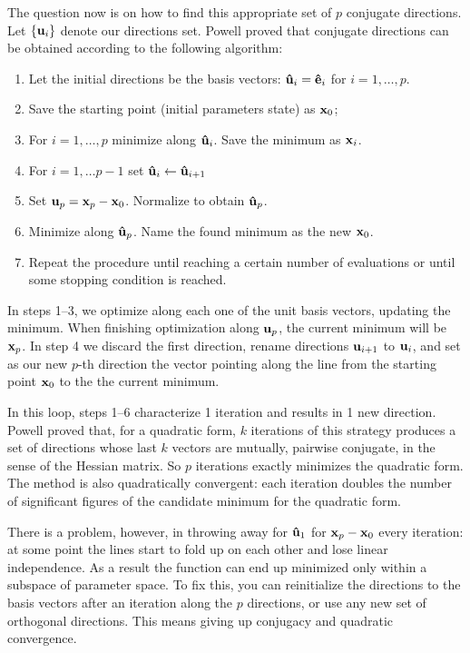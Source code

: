 The question now is on how to find this appropriate set of $p$ conjugate directions. Let $\{\vb{u}_i\}$ denote our directions set. Powell \cite{powell_efficient_1964} proved that conjugate directions can be obtained according to the following algorithm:
\begin{enumerate}
    \item Let the initial directions be the basis vectors: $\vu{u}_i=\vu{e}_i$ for $i=1,\dots, p$.
    \item Save the starting point (initial parameters state) as $\vb{x}_0$;
    \item For $i=1,\dots, p$ minimize along $\vu{u}_i$. Save the minimum as $\vb{x}_i$.
    \item For $i=1,\dots p-1$ set $\vu{u}_i\leftarrow\vu{u}_{i+1}$
    \item Set $\vb{u}_p=\vb{x}_p - \vb{x}_0$. Normalize to obtain $\vu{u}_p$.
    \item Minimize along $\vu{u}_p$. Name the found minimum as the new $\vb{x}_0$.
    \item Repeat the procedure until reaching a certain number of evaluations or until some stopping condition is reached.
\end{enumerate}

In steps 1--3, we optimize along each one of the unit basis vectors, updating the minimum. When finishing optimization along $\vb{u}_p$, the current minimum will be $\vb{x}_p$. In step 4 we discard the first direction, rename directions $\vb{u}_{i+1}$ to $\vb{u}_i$, and set as our new $p$-th direction the vector pointing along the line from the starting point $\vb{x}_0$ to the the current minimum.

In this loop, steps 1--6 characterize 1 iteration and results in 1 new direction. Powell proved that, for a quadratic form, $k$ iterations of this strategy produces a set of directions whose last $k$ vectors are mutually, pairwise conjugate, in the sense of the Hessian matrix. So $p$ iterations exactly minimizes the quadratic form. The method is also quadratically convergent: each iteration doubles the number of significant figures of the candidate minimum for the quadratic form.

There is a problem, however, in throwing away  for $\vu{u}_1$ for $\vb{x}_p - \vb{x}_0$ every iteration: at some point the lines start to fold up on each other and lose linear independence. As a result the function can end up minimized only within a subspace of parameter space. To fix this, you can reinitialize the directions to the basis vectors after an iteration along the $p$ directions, or use any new set of orthogonal directions. This means giving up conjugacy and quadratic convergence.


